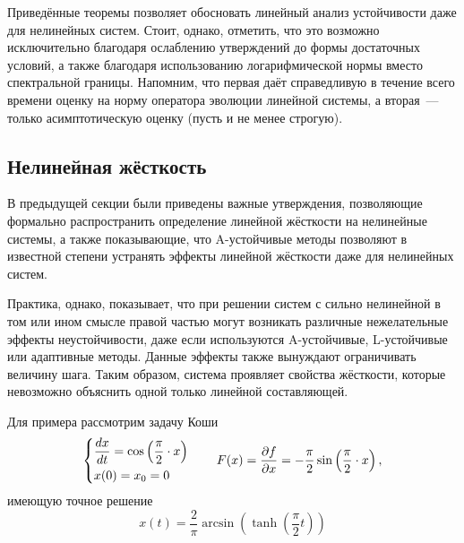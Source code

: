 Приведённые теоремы позволяет обосновать линейный анализ устойчивости даже для нелинейных систем.
Стоит, однако, отметить, что это возможно исключительно благодаря ослаблению утверждений до формы достаточных условий,
а также благодаря использованию логарифмической нормы вместо спектральной границы.
Напомним, что первая даёт справедливую в течение всего времени оценку на норму оператора эволюции линейной системы,
а вторая~--- только асимптотическую оценку (пусть и не менее строгую).


\subsection{Нелинейная жёсткость}
\label{subsec:nonlinear_stiffness}

В предыдущей секции были приведены важные утверждения,
позволяющие формально распространить определение линейной жёсткости на нелинейные системы,
а также показывающие, что A-устойчивые методы позволяют в известной степени устранять эффекты линейной жёсткости даже для нелинейных систем.

Практика, однако, показывает, что при решении систем с сильно нелинейной в том или ином смысле правой частью
могут возникать различные нежелательные эффекты неустойчивости,
даже если используются A-устойчивые, L-устойчивые или адаптивные методы.
Данные эффекты также вынуждают ограничивать величину шага.
Таким образом, система проявляет свойства жёсткости, которые невозможно объяснить одной только линейной составляющей.

Для примера рассмотрим задачу Коши
%
\begin{equation}
    \label{eq:cosine_system}
    \begin{dcases}
        \frac{d x}{d t} = \cos\left( \frac{\pi}{2} \cdot x \right) \\
        x(0) = x_0 = 0
    \end{dcases}
    \qquad
    F(x) = \frac{\partial f}{\partial x} = - \frac{\pi}{2} \sin\left( \frac{\pi}{2} \cdot x \right),
\end{equation}
%
имеющую точное решение
\begin{equation}
    \label{eq:cosine_system_solution}
    x(t) = \frac{2}{\pi} \arcsin\left( \tanh\left( \frac{\pi}{2} t \right) \right)
\end{equation}

